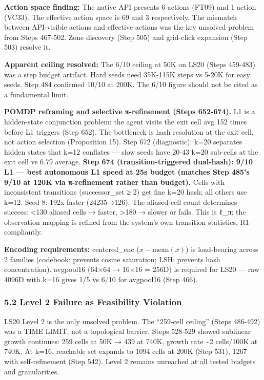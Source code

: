 \documentclass[
  11pt,
]{article}
\begin{document}
\textbf{Action space finding:} The native API presents 6 actions (FT09)
and 1 action (VC33). The effective action space is 69 and 3
respectively. The mismatch between API-visible actions and effective
actions was the key unsolved problem from Steps 467-502. Zone discovery
(Step 505) and grid-click expansion (Step 503) resolve it.

\textbf{Apparent ceiling resolved:} The 6/10 ceiling at 50K on LS20
(Steps 459-483) was a step budget artifact. Hard seeds need 35K-115K
steps vs 5-20K for easy seeds. Step 484 confirmed 10/10 at 200K. The
6/10 figure should not be cited as a fundamental limit.

\textbf{POMDP reframing and selective π-refinement (Steps 652-674).} L1
is a hidden-state conjunction problem: the agent visits the exit cell
avg 152 times before L1 triggers (Step 652). The bottleneck is hash
resolution at the exit cell, not action selection (Proposition 15). Step
672 (diagnostic): k=20 separates hidden states that k=12 conflates ---
slow seeds have 20-43 k=20 sub-cells at the exit cell vs 6.79 average.
\textbf{Step 674 (transition-triggered dual-hash): 9/10 L1 --- best
autonomous L1 speed at 25s budget (matches Step 485's 9/10 at 120K via
π-refinement rather than budget).} Cells with inconsistent transitions
(\textbar successor\_set\textbar{} ≥ 2) get fine k=20 hash; all others
use k=12. Seed 8: 192x faster (24235→126). The aliased-cell count
determines success: \textless130 aliased cells → faster, \textgreater180
→ slower or fails. This is ℓ\_π: the observation mapping is refined from
the system's own transition statistics, R1-compliantly.

\textbf{Encoding requirements:} centered\_enc (\(x - \text{mean}(x)\))
is load-bearing across 2 families (codebook: prevents cosine saturation;
LSH: prevents hash concentration). avgpool16 (64×64 → 16×16 = 256D) is
required for LS20 --- raw 4096D with k=16 gives 1/5 vs 6/10 for
avgpool16 (Step 466).

\subsubsection{5.2 Level 2 Failure as Feasibility
Violation}\label{level-2-failure-as-feasibility-violation}

LS20 Level 2 is the only unsolved problem. The ``259-cell ceiling''
(Steps 486-492) was a TIME LIMIT, not a topological barrier. Steps
528-529 showed sublinear growth continues: 259 cells at 50K → 439 at
740K, growth rate \textasciitilde2 cells/100K at 740K. At k=16,
reachable set expands to 1094 cells at 200K (Step 531), 1267 with
self-refinement (Step 542). Level 2 remains unreached at all tested
budgets and granularities.
\end{document}
